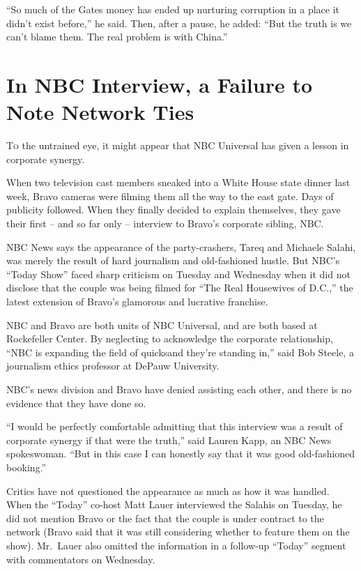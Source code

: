 ﻿\documentclass[12pt]{article}
\begin{document}
``So much of the Gates money has ended up nurturing corruption in a place it didn't exist before,''
he said. Then, after a pause, he added: ``But the truth is we can't blame them. The real problem is
with China.''

\section{In NBC Interview, a Failure to Note Network Ties}

\lettrine{T}{o} the untrained eye, it might appear that NBC Universal has
given a lesson in corporate synergy\cite{synergy}.

When two television cast members sneaked into a White House state dinner last week, Bravo cameras
were filming them all the way to the east gate. Days of publicity followed. When they finally
decided to explain themselves, they gave their first -- and so far only -- interview to Bravo's
corporate sibling, NBC.

NBC News says the appearance of the party-crashers, Tareq and Michaele Salahi, was merely the result
of hard journalism and old-fashioned hustle. But NBC's ``Today Show'' faced sharp criticism on
Tuesday and Wednesday when it did not disclose that the couple was being filmed for ``The Real
Housewives of D.C.,'' the latest extension of Bravo's glamorous and lucrative franchise.

NBC and Bravo are both units of NBC Universal, and are both based at Rockefeller Center. By
neglecting to acknowledge the corporate relationship, ``NBC is expanding the field of quicksand
they're standing in,'' said Bob Steele, a journalism ethics professor at DePauw University.

NBC's news division and Bravo have denied assisting each other, and there is no evidence that they
have done so.

``I would be perfectly comfortable admitting that this interview was a result of corporate synergy
if that were the truth,'' said Lauren Kapp, an NBC News spokeswoman. ``But in this case I can
honestly say that it was good old-fashioned booking.''

Critics have not questioned the appearance as much as how it was handled. When the ``Today'' co-host
Matt Lauer interviewed the Salahis on Tuesday, he did not mention Bravo or the fact that the couple
is under contract to the network (Bravo said that it was still considering whether to feature them
on the show). Mr.~Lauer also omitted the information in a follow-up ``Today'' segment with
commentators on Wednesday.
\end{document}
